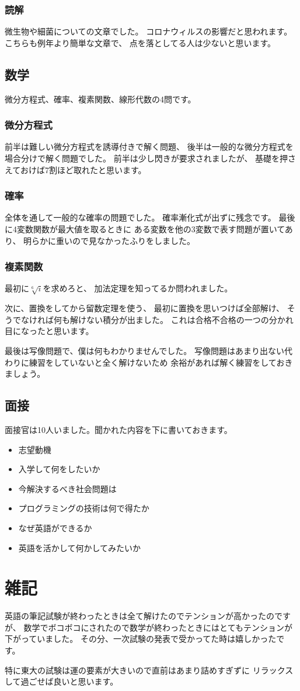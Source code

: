 \documentclass[]{jsarticle}
\begin{document}
        \subsubsection*{読解}
            微生物や細菌についての文章でした。
            コロナウィルスの影響だと思われます。
            こちらも例年より簡単な文章で、
            点を落としてる人は少ないと思います。
    \subsection*{数学}
        微分方程式、確率、複素関数、線形代数の4問です。
        \subsubsection*{微分方程式}
            前半は難しい微分方程式を誘導付きで解く問題、
            後半は一般的な微分方程式を場合分けで解く問題でした。
            前半は少し閃きが要求されましたが、
            基礎を押さえておけば7割ほど取れたと思います。
        \subsubsection*{確率}
            全体を通して一般的な確率の問題でした。
            確率漸化式が出ずに残念です。
            最後に4変数関数が最大値を取るときに
            ある変数を他の3変数で表す問題が置いてあり、
            明らかに重いので見なかったふりをしました。
        \subsubsection*{複素関数}
            最初に$\sqrt[6]{i}$を求めろと、
            加法定理を知ってるか問われました。

            次に、置換をしてから留数定理を使う、
            最初に置換を思いつけば全部解け、
            そうでなければ何も解けない積分が出ました。
            これは合格不合格の一つの分かれ目になったと思います。

            最後は写像問題で、僕は何もわかりませんでした。
            写像問題はあまり出ない代わりに練習をしていないと全く解けないため
            余裕があれば解く練習をしておきましょう。
    \subsection*{面接}
        面接官は10人いました。聞かれた内容を下に書いておきます。
        \begin{itemize}
            \item 志望動機
            \item 入学して何をしたいか
            \item 今解決するべき社会問題は
            \item プログラミングの技術は何で得たか
            \item なぜ英語ができるか
            \item 英語を活かして何かしてみたいか
        \end{itemize}
\section*{雑記}
    英語の筆記試験が終わったときは全て解けたのでテンションが高かったのですが、
    数学でボコボコにされたので数学が終わったときにはとてもテンションが下がっていました。
    その分、一次試験の発表で受かってた時は嬉しかったです。

    特に東大の試験は運の要素が大きいので直前はあまり詰めすぎずに
    リラックスして過ごせば良いと思います。
\end{document}
